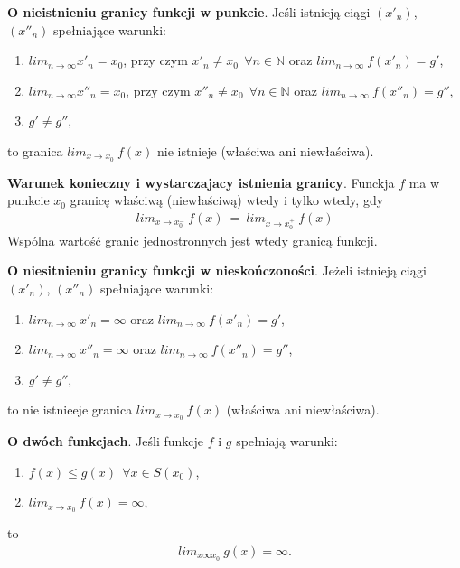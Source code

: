 \documentclass[12pt]{article}
\begin{document}
    \begin{theorem}
        \textbf{O nieistnieniu granicy funkcji w punkcie}. Jeśli istnieją ciągi $(x'_n)$, $(x''_n)$ spełniające warunki:
        \begin{enumerate}
            \item $lim_{n \rightarrow \infty} x'_n = x_0$, przy czym $x'_n \neq x_0 ~~ \forall n \in \mathbb{N}$
            oraz $lim_{n \rightarrow \infty}  ~ f(x'_n) = g'$,
            \item $lim_{n \rightarrow \infty} x''_n = x_0$, przy czym $x''_n \neq x_0 ~~ \forall n \in \mathbb{N}$
            oraz $lim_{n \rightarrow \infty}  ~ f(x''_n) = g''$,
            \item $g' \neq g''$,
        \end{enumerate}
        to granica $lim_{x \rightarrow x_0} ~ f(x)$ nie istnieje (właściwa ani niewłaściwa).
    \end{theorem}

    \begin{theorem}
        \textbf{Warunek konieczny i wystarczajacy istnienia granicy}. Funckja $f$ ma w punkcie $x_0$ granicę
        właściwą (niewłaściwą) wtedy i tylko wtedy, gdy
        \begin{align*}
            lim_{x \rightarrow x^{-}_0}  ~ f(x) ~ = ~ lim_{x \rightarrow x^{+}_0}  ~ f(x)
        \end{align*}
        Wspólna wartość granic jednostronnych jest wtedy granicą funkcji.
    \end{theorem}

    \begin{theorem}
        \textbf{O niesitnieniu granicy funkcji w nieskończoności}. Jeżeli istnieją ciągi $(x'_n)$, $(x''_n)$
        spełniające warunki:
        \begin{enumerate}
            \item $lim_{n \rightarrow \infty} ~ x'_n = \infty $ oraz $ lim_{n \rightarrow \infty} ~ f(x'_n) = g'$,
            \item $lim_{n \rightarrow \infty} ~ x''_n = \infty $ oraz $ lim_{n \rightarrow \infty} ~ f(x''_n) = g''$,
            \item $g' \neq g''$,
        \end{enumerate}
        to nie istnieeje granica $lim_{x \rightarrow x_0} ~ f(x)$ (właściwa ani niewłaściwa).
    \end{theorem}

    \begin{theorem}
        \textbf{O dwóch funkcjach}. Jeśli funkcje $f$ i $g$ spełniają warunki:
        \begin{enumerate}
            \item $f(x) \leq g(x) ~~ \forall x \in S(x_0)$,
            \item $lim_{x \rightarrow x_0} ~ f(x) = \infty$,
        \end{enumerate}
        to
        \begin{align*}
            lim_{x \infty x_0} ~ g(x) = \infty.
        \end{align*}
    \end{theorem}
\end{document}

